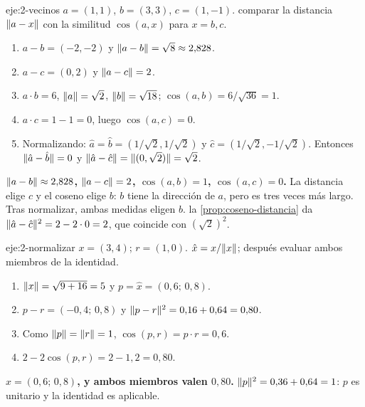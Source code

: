 \begin{solucion}{eje:2-vecinos}
\datos $a=(1,1)$, $b=(3,3)$, $c=(1,-1)$.
\planteamiento comparar la distancia $\lVert a-x\rVert$ con la similitud $\cos(a,x)$ para $x=b,c$.
\pasos
\begin{enumerate}[label=\arabic*.]
  \item $a-b=(-2,-2)$ y $\lVert a-b\rVert=\sqrt8\approx 2{,}828$.
  \item $a-c=(0,2)$ y $\lVert a-c\rVert=2$.
  \item $a\cdot b=6$, $\lVert a\rVert=\sqrt2$, $\lVert b\rVert=\sqrt{18}$; $\cos(a,b)=6/\sqrt{36}=1$.
  \item $a\cdot c=1-1=0$, luego $\cos(a,c)=0$.
  \item Normalizando: $\hat a=\hat b=(1/\sqrt2,1/\sqrt2)$ y $\hat c=(1/\sqrt2,-1/\sqrt2)$. Entonces $\lVert\hat a-\hat b\rVert=0$ y $\lVert\hat a-\hat c\rVert=\lVert(0,\sqrt2)\rVert=\sqrt2$.
\end{enumerate}
\resultado \textbf{$\lVert a-b\rVert\approx 2{,}828$, $\lVert a-c\rVert=2$, $\cos(a,b)=1$, $\cos(a,c)=0$.} La distancia elige $c$ y el coseno elige $b$: $b$ tiene la dirección de $a$, pero es tres veces más largo. Tras normalizar, ambas medidas eligen $b$.
\comprobacion la \cref{prop:coseno-distancia} da $\lVert\hat a-\hat c\rVert^{2}=2-2\cdot 0=2$, que coincide con $(\sqrt2)^{2}$.
\end{solucion}

\begin{solucion}{eje:2-normalizar}
\datos $x=(3,4)$; $r=(1,0)$.
\planteamiento $\hat x=x/\lVert x\rVert$; después evaluar ambos miembros de la identidad.
\pasos
\begin{enumerate}[label=\arabic*.]
  \item $\lVert x\rVert=\sqrt{9+16}=5$ y $p=\hat x=(0{,}6;\,0{,}8)$.
  \item $p-r=(-0{,}4;\,0{,}8)$ y $\lVert p-r\rVert^{2}=0{,}16+0{,}64=0{,}80$.
  \item Como $\lVert p\rVert=\lVert r\rVert=1$, $\cos(p,r)=p\cdot r=0{,}6$.
  \item $2-2\cos(p,r)=2-1{,}2=0{,}80$.
\end{enumerate}
\resultado \textbf{$\hat x=(0{,}6;\,0{,}8)$, y ambos miembros valen $0{,}80$.}
\comprobacion $\lVert p\rVert^{2}=0{,}36+0{,}64=1$: $p$ es unitario y la identidad es aplicable.
\end{solucion}

